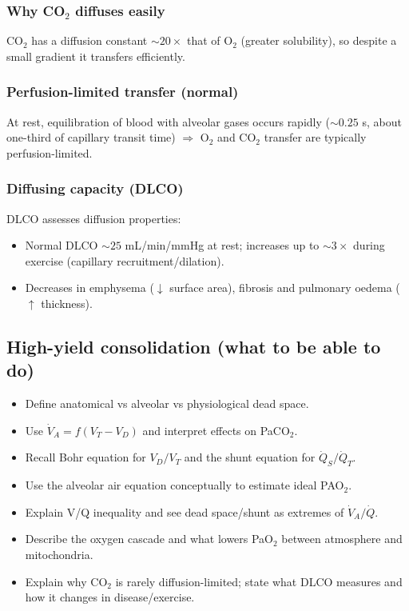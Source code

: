 \documentclass[11pt,a4paper]{article}
\begin{document}
\subsubsection{Why CO$_2$ diffuses easily}
CO$_2$ has a diffusion constant \(\sim 20\times\) that of O$_2$ (greater solubility), so despite a small gradient it transfers efficiently.

\subsubsection{Perfusion-limited transfer (normal)}
At rest, equilibration of blood with alveolar gases occurs rapidly (\(\sim 0.25\) s, about one-third of capillary transit time) \(\Rightarrow\) O$_2$ and CO$_2$ transfer are typically perfusion-limited.

\subsubsection{Diffusing capacity (DLCO)}
DLCO assesses diffusion properties:
\begin{itemize}
  \item Normal DLCO \(\sim 25\) mL/min/mmHg at rest; increases up to \(\sim 3\times\) during exercise (capillary recruitment/dilation).
  \item Decreases in emphysema (\(\downarrow\) surface area), fibrosis and pulmonary oedema (\(\uparrow\) thickness).
\end{itemize}

\subsection{High-yield consolidation (what to be able to do)}
\begin{itemize}
  \item Define anatomical vs alveolar vs physiological dead space.
  \item Use \(\dot V_A = f(V_T - V_D)\) and interpret effects on PaCO$_2$.
  \item Recall Bohr equation for \(V_D/V_T\) and the shunt equation for \(\dot Q_S/\dot Q_T\).
  \item Use the alveolar air equation conceptually to estimate ideal PAO$_2$.
  \item Explain V/Q inequality and see dead space/shunt as extremes of \(\dot V_A/\dot Q\).
  \item Describe the oxygen cascade and what lowers PaO$_2$ between atmosphere and mitochondria.
  \item Explain why CO$_2$ is rarely diffusion-limited; state what DLCO measures and how it changes in disease/exercise.
\end{itemize}
\end{document}
